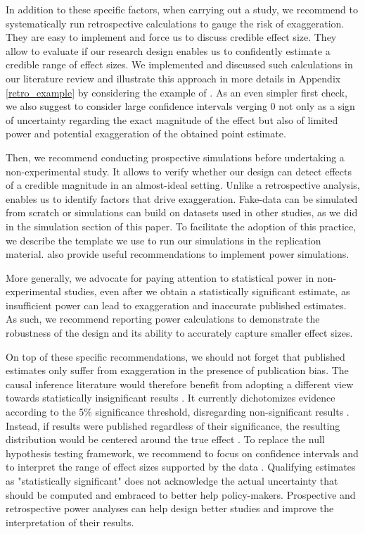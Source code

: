 \documentclass[12pt]{article}
\begin{document}
        In addition to these specific factors, when carrying out a study, we recommend to systematically run retrospective calculations to gauge the risk of exaggeration. They are easy to implement and force us to discuss credible effect size. They allow to evaluate if our research design enables us to confidently estimate a credible range of effect sizes. We implemented and discussed such calculations in our literature review and illustrate this approach in more details in Appendix \ref{retro_example} by considering the example of \cite{deryugina_mortality_2019}. As an even simpler first check, we also suggest to consider large confidence intervals verging 0 not only as a sign of uncertainty regarding the exact magnitude of the effect but also of limited power and potential exaggeration of the obtained point estimate.

        Then, we recommend conducting prospective simulations before undertaking a non-experimental study. It allows to verify whether our design can detect effects of a credible magnitude in an almost-ideal setting. Unlike a retrospective analysis, enables us to identify factors that drive exaggeration. Fake-data can be simulated from scratch or simulations can build on datasets used in other studies, as we did in the simulation section of this paper. To facilitate the adoption of this practice, we describe the template we use to run our simulations in the replication material. \cite{black_simulated_2022} also provide useful recommendations to implement power simulations.

        More generally, we advocate for paying attention to statistical power in non-experimental studies, even after we obtain a statistically significant estimate, as insufficient power can lead to exaggeration and inaccurate published estimates. As such, we recommend reporting power calculations to demonstrate the robustness of the design and its ability to accurately capture smaller effect sizes.

        On top of these specific recommendations, we should not forget that published estimates only suffer from exaggeration in the presence of publication bias. The causal inference literature would therefore benefit from adopting a different view towards statistically insignificant results \citep{ziliak_cult_2008, wasserstein_asa_2016, mcshane_abandon_2019}. It currently dichotomizes evidence according to the 5\% significance threshold, disregarding non-significant results \citep{greenland_invited_2017}. Instead, if results were published regardless of their significance, the resulting distribution would be centered around the true effect \citep{hernan_causal_2022}. To replace the null hypothesis testing framework, we recommend to focus on confidence intervals and to interpret the range of effect sizes supported by the data \citep{amrhein_inferential_2019, romer2020praise}. 
        Qualifying estimates as "statistically significant" does not acknowledge the actual uncertainty that should be computed and embraced to better help policy-makers. Prospective and retrospective power analyses can help design better studies and improve the interpretation of their results.
        
\end{document}
